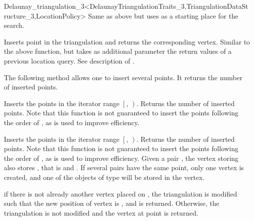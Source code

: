 \begin{ccRefClass}{Delaunay_triangulation_3<DelaunayTriangulationTraits_3,TriangulationDataStructure_3,LocationPolicy>}
{ Same as above but uses  as a starting place for the search. }

{Inserts point  in the triangulation and returns the corresponding
 vertex. Similar to the above  function, but takes as additional
 parameter the return values of a previous location query.  See description of
 .}

The following method allows one to insert several points. It returns the
number of inserted points. 


{Inserts the points in the iterator range $\left[\right.$,
$\left.\right)$.  Returns the number of inserted points.
Note that this function is not guaranteed to insert the points
following the order of , as 
is used to improve efficiency.
}


{
Inserts the points in the iterator range $\left[\right.$,
$\left.\right)$.  Returns the number of inserted points.
Note that this function is not guaranteed to insert the points
following the order of , as 
is used to improve efficiency.
Given a pair ,  the vertex  storing  also stores , that is 
 and . If several pairs have the same point, 
only one vertex is created, and one of the objects of type  will be stored in the vertex.
}




{ if there is not already another vertex placed on , 
the triangulation is modified such that the new position of vertex 
is , and  is returned. Otherwise, the triangulation is not
modified and the vertex at point  is returned.
}


\end{ccRefClass}
